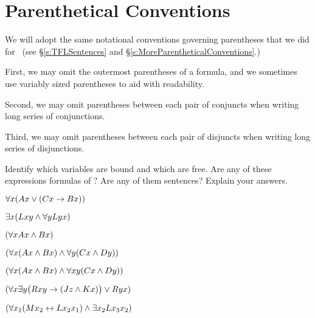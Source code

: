 \section{Parenthetical Conventions}

We will adopt the same notational conventions governing parentheses that we did for \TFL\ (see §\ref{s:TFLSentences} and §\ref{s:MoreParentheticalConventions}.) 

First, we may omit the outermost parentheses of a formula, and we sometimes use variably sized parentheses to aid with readability.  

Second, we may omit parentheses between each pair of conjuncts when writing long series of conjunctions. 

Third, we may omit parentheses between each pair of disjuncts when writing long series of disjunctions.


\practiceproblems
\problempart
\label{pr.freeFOL}
Identify which variables are bound and which are free. Are any of these expressions formulas of \FOL? Are any of them sentences? Explain your answers.
\begin{earg}
\item $\forall x (Ax \vee (Cx \rightarrow Bx))$
\item $\exists x (Lxy \wedge \forall y Lyx)$
\item $(\forall x Ax \wedge Bx)$
\item $(\forall x (Ax \wedge Bx) \wedge \forall y(Cx \wedge Dy))$
\item $(\forall x (Ax \wedge Bx) \wedge \forall xy(Cx \wedge Dy))$
\item $(\forall x\exists y\bigl(Rxy \rightarrow (Jz \wedge Kx) \bigr) \vee Ryx)$
\item $(\forall x_{1}(Mx_{2} \leftrightarrow Lx_{2}x_{1}) \wedge \exists x_{2} Lx_{3}x_{2})$
\end{earg}

